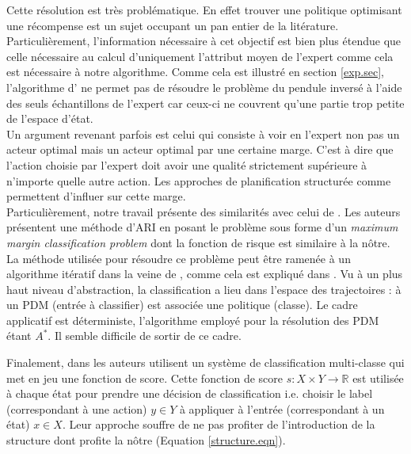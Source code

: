 \documentclass[publibook-draft]{CAp2012}
\begin{document}
Cette résolution est très problématique. En effet trouver une politique optimisant une récompense est un sujet occupant un pan entier de la litérature. Particulièrement, l'information nécessaire à cet objectif est bien plus étendue que celle nécessaire au calcul d'uniquement l'attribut moyen de l'expert comme cela est nécessaire à notre algorithme. Comme cela est illustré en section \ref{exp.sec}, l'algorithme d'\citet{abbeel2004apprenticeship} ne permet pas de résoudre le problème du pendule inversé à l'aide des seuls échantillons de l'expert car ceux-ci ne couvrent qu'une partie trop petite de l'espace d'état.\\

Un argument revenant parfois est celui qui consiste à voir en l'expert non pas un acteur optimal mais un acteur optimal par une certaine marge. C'est à dire que l'action choisie par l'expert doit avoir une qualité strictement supérieure à n'importe quelle autre action. Les approches de planification structurée comme \citet{ratliff2006maximum,ratliff2007imitation, ratliff2007boosting, kolter2008hierarchical} permettent d'influer sur cette marge.\\

Particulièrement, notre travail présente des similarités avec celui de \citet{ratliff2006maximum}. Les auteurs présentent une méthode d'ARI en posant le problème sous forme d'un \emph{maximum margin classification problem} dont la fonction de risque est similaire à la nôtre. La méthode utilisée pour résoudre ce problème peut être ramenée à un algorithme itératif dans la veine de \cite{abbeel2004apprenticeship}, comme cela est expliqué dans \cite{neu2009training}. Vu à un plus haut niveau d'abstraction, la classification a lieu dans l'espace des trajectoires : à un PDM (entrée à classifier) est associée une politique (classe). Le cadre applicatif est déterministe, l'algorithme employé pour la résolution des PDM étant $A^*$. Il semble difficile de sortir de ce cadre.

Finalement, dans \citep{ratliff2007imitation} les auteurs utilisent un système de classification multi-classe qui met en jeu une fonction de score. Cette fonction de score $s : X\times Y \rightarrow \mathbb{R}$ est utilisée à chaque état pour prendre une décision de classification i.e. choisir le label (correspondant à une action) $y\in Y$ à appliquer à l'entrée (correspondant à un état) $x\in X$. Leur approche souffre de ne pas profiter de l'introduction de la structure dont profite la nôtre (Equation \eqref{structure.eqn}).\\
\end{document}
